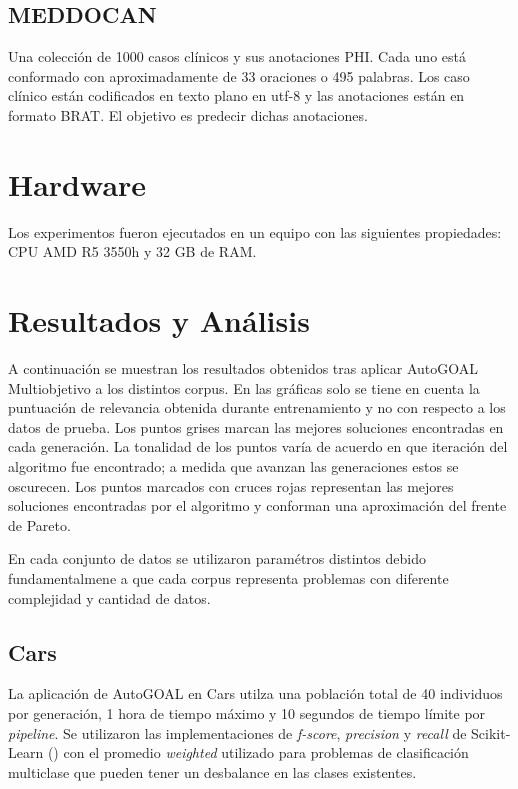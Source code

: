 \subsection{MEDDOCAN}

Una colecci\'on de 1000 casos cl\'inicos y sus anotaciones PHI. Cada uno est\'a conformado con aproximadamente de 33 oraciones o 495 palabras. Los caso cl\'inico est\'an codificados en texto plano en utf-8 y las anotaciones est\'an en formato BRAT. El objetivo es predecir dichas anotaciones.

\section{Hardware}
 Los experimentos fueron ejecutados en un equipo con las siguientes propiedades: CPU AMD R5 3550h y 32 GB de RAM.

\section{Resultados y An\'alisis}

A continuaci\'on se muestran los resultados obtenidos tras aplicar AutoGOAL Multiobjetivo a los distintos corpus. En las gr\'aficas solo se tiene en cuenta la puntuaci\'on de relevancia obtenida durante entrenamiento y no con respecto a los datos de prueba. Los puntos  grises marcan las mejores soluciones encontradas en cada generaci\'on.  La tonalidad de los puntos var\'ia de acuerdo en que iteraci\'on del algoritmo fue encontrado; a medida que avanzan las generaciones estos se oscurecen. Los puntos marcados con cruces rojas representan las mejores soluciones encontradas por el algoritmo y conforman una aproximaci\'on del frente de Pareto.

En cada conjunto de datos se utilizaron param\'etros distintos debido fundamentalmene a que cada corpus representa problemas con diferente complejidad y cantidad de datos.

\subsection{Cars}
La aplicaci\'on de AutoGOAL en Cars utilza una poblaci\'on total de 40 individuos por generaci\'on, 1 hora de tiempo m\'aximo y 10 segundos de tiempo l\'imite por \textit{pipeline}. Se utilizaron las implementaciones de \textit{f-score}, \textit{precision} y \textit{recall} de Scikit-Learn (\cite{pedregosa2011scikit}) con el promedio \textit{weighted} utilizado para problemas de clasificaci\'on multiclase que pueden tener un desbalance en las clases existentes.

